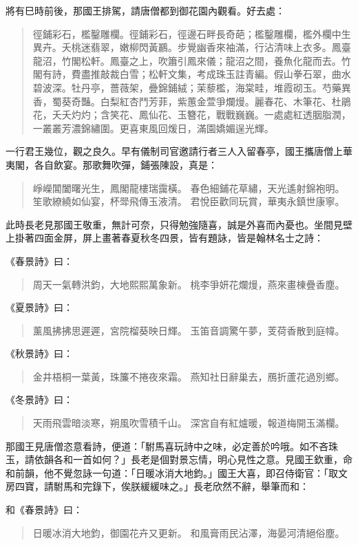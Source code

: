 將有巳時前後，那國王排駕，請唐僧都到御花園內觀看。好去處：
\begin{quote}
徑鋪彩石，檻鑿雕欄。徑鋪彩石，徑邊石畔長奇葩；檻鑿雕欄，檻外欄中生異卉。夭桃迷翡翠，嫩柳閃黃鸝。步覺幽香來袖滿，行沾清味上衣多。鳳臺龍沼，竹閣松軒。鳳臺之上，吹簫引鳳來儀；龍沼之間，養魚化龍而去。竹閣有詩，費盡推敲裁白雪；松軒文集，考成珠玉註青編。假山拳石翠，曲水碧波深。牡丹亭，薔薇架，疊錦鋪絨；茉藜檻，海棠畦，堆霞砌玉。芍藥異香，蜀葵奇豔。白梨紅杏鬥芳菲，紫蕙金萱爭爛熳。麗春花、木筆花、杜鵑花，夭夭灼灼；含笑花、鳳仙花、玉簪花，戰戰巍巍。一處處紅透胭脂潤，一叢叢芳濃錦繡圍。更喜東風回煖日，滿園嬌媚逞光輝。
\end{quote}

一行君王幾位，觀之良久。早有儀制司官邀請行者三人入留春亭，國王攜唐僧上華夷閣，各自飲宴。那歌舞吹彈，鋪張陳設，真是：
\begin{quote}
崢嶸閶闔曙光生，鳳閣龍樓瑞靄橫。
春色細鋪花草繡，天光遙射錦袍明。
笙歌繚繞如仙宴，杯斝飛傳玉液清。
君悅臣歡同玩賞，華夷永鎮世康寧。
\end{quote}

此時長老見那國王敬重，無計可奈，只得勉強隨喜，誠是外喜而內憂也。坐間見壁上掛著四面金屏，屏上畫著春夏秋冬四景，皆有題詠，皆是翰林名士之詩：

《春景詩》曰：
\begin{quote}
周天一氣轉洪鈞，大地熙熙萬象新。
桃李爭妍花爛熳，燕來畫棟疊香塵。
\end{quote}

《夏景詩》曰：
\begin{quote}
薰風拂拂思遲遲，宮院榴葵映日輝。
玉笛音調驚午夢，芰荷香散到庭幃。
\end{quote}

《秋景詩》曰：
\begin{quote}
金井梧桐一葉黃，珠簾不捲夜來霜。
燕知社日辭巢去，鴈折蘆花過別鄉。
\end{quote}

《冬景詩》曰：
\begin{quote}
天雨飛雲暗淡寒，朔風吹雪積千山。
深宮自有紅爐暖，報道梅開玉滿欄。
\end{quote}

那國王見唐僧恣意看詩，便道：「駙馬喜玩詩中之味，必定善於吟哦。如不吝珠玉，請依韻各和一首如何？」長老是個對景忘情，明心見性之意。見國王欽重，命和前韻，他不覺忽詠一句道：「日暖冰消大地鈞。」國王大喜，即召侍衛官：「取文房四寶，請駙馬和完錄下，俟朕緩緩味之。」長老欣然不辭，舉筆而和：

和《春景詩》曰：
\begin{quote}
日暖冰消大地鈞，御園花卉又更新。
和風膏雨民沾澤，海晏河清絕俗塵。
\end{quote}

